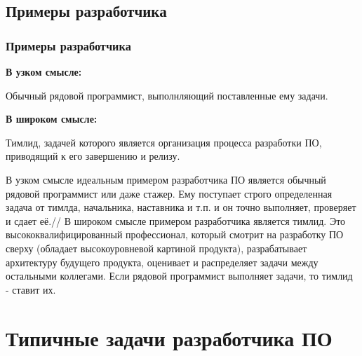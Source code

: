 \documentclass{../industrial-development}
\begin{document}
\subsection{Примеры разработчика}
\begin{frame} \frametitle{Примеры разработчика}
	\begin{minipage}{0.47\textwidth}
		\textbf{В узком смысле:}
		
		Обычный рядовой программист, выполнляющий поставленные ему задачи.
	\end{minipage}
\hfill
	\begin{minipage}{0.5\textwidth}
		\textbf{В широком смысле:}
		
		Тимлид, задачей которого является организация процесса разработки ПО, приводящий к его завершению и релизу.
	\end{minipage}
\end{frame}
\lecturenotes
В узком смысле идеальным примером разработчика ПО является обычный рядовой программист или даже стажер. Ему поступает строго определенная задача от тимлда, начальника, наставника и т.п. и он точно выполняет, проверяет и сдает её.//
В широком смысле примером разработчика является тимлид. Это высококвалифицированный профессионал, который смотрит на разработку ПО сверху (обладает высокоуровневой картиной продукта), разрабатывает архитектуру будущего продукта, оценивает и распределяет задачи между остальными коллегами. Если рядовой программист выполняет задачи, то тимлид - ставит их.


\section{Типичные задачи разработчика ПО}
\end{document}
